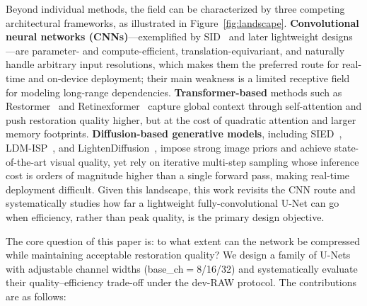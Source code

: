 \documentclass[remotesensing,article,accept,moreauthors]{Definitions/mdpi}
\begin{document}
Beyond individual methods, the field can be characterized by three competing architectural frameworks, as illustrated in Figure~\ref{fig:landscape}. \textbf{Convolutional neural networks (CNNs)}---exemplified by SID~\citep{chen2018sid} and later lightweight designs---are parameter- and compute-efficient, translation-equivariant, and naturally handle arbitrary input resolutions, which makes them the preferred route for real-time and on-device deployment; their main weakness is a limited receptive field for modeling long-range dependencies. \textbf{Transformer-based} methods such as Restormer~\citep{zamir2022restormer} and Retinexformer~\citep{cai2023retinexformer} capture global context through self-attention and push restoration quality higher, but at the cost of quadratic attention and larger memory footprints. \textbf{Diffusion-based generative models}, including SIED~\citep{jiang2025sied}, LDM-ISP~\citep{wen2023ldmisp}, and LightenDiffusion~\citep{jiang2024lightendiffusion}, impose strong image priors and achieve state-of-the-art visual quality, yet rely on iterative multi-step sampling whose inference cost is orders of magnitude higher than a single forward pass, making real-time deployment difficult. Given this landscape, this work revisits the CNN route and systematically studies how far a lightweight fully-convolutional U-Net can go when efficiency, rather than peak quality, is the primary design objective.

The core question of this paper is: to what extent can the network be compressed while maintaining acceptable restoration quality? We design a family of U-Nets with adjustable channel widths (base\_ch$=$8/16/32) and systematically evaluate their quality--efficiency trade-off under the dev-RAW protocol. The contributions are as follows:
\end{document}
